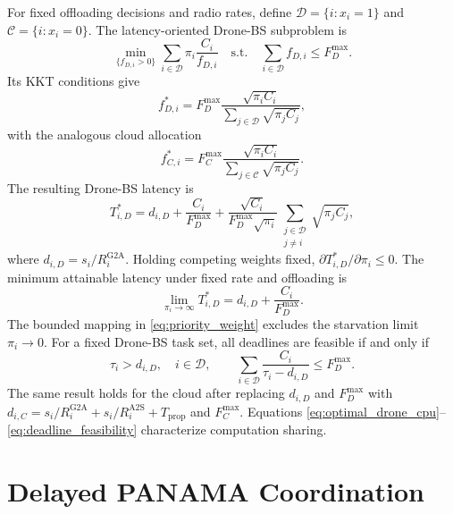 \IfFileExists{IEEEtran.cls}{\documentclass[conference]{IEEEtran}}{\documentclass[10pt,twocolumn]{article}}
\newcommand{\Dset}{\mathcal{D}}
\newcommand{\Cset}{\mathcal{C}}
\begin{document}
For fixed offloading decisions and radio rates, define $\Dset=\{i:x_i=1\}$ and $\Cset=\{i:x_i=0\}$. The latency-oriented Drone-BS subproblem is
\begin{equation}
    \min_{\{f_{D,i}>0\}}
    \sum_{i\in\Dset}\pi_i\frac{C_i}{f_{D,i}}
    \quad\mathrm{s.t.}\quad
    \sum_{i\in\Dset}f_{D,i}\leq F_D^{\max}.
\end{equation}
Its KKT conditions give
\begin{equation}
    f_{D,i}^{*}
    =F_D^{\max}
    \frac{\sqrt{\pi_iC_i}}
    {\sum_{j\in\Dset}\sqrt{\pi_jC_j}},
    \label{eq:optimal_drone_cpu}
\end{equation}
with the analogous cloud allocation
\begin{equation}
    f_{C,i}^{*}
    =F_C^{\max}
    \frac{\sqrt{\pi_iC_i}}
    {\sum_{j\in\Cset}\sqrt{\pi_jC_j}}.
\end{equation}
The resulting Drone-BS latency is
\begin{equation}
    T_{i,D}^{*}
    =d_{i,D}+\frac{C_i}{F_D^{\max}}
    +\frac{\sqrt{C_i}}{F_D^{\max}\sqrt{\pi_i}}
    \sum_{\substack{j\in\Dset\\j\neq i}}\sqrt{\pi_jC_j},
    \label{eq:priority_delay}
\end{equation}
where $d_{i,D}=s_i/R_i^{\mathrm{G2A}}$. Holding competing weights fixed, $\partial T_{i,D}^{*}/\partial\pi_i\leq0$. The minimum attainable latency under fixed rate and offloading is
\begin{equation}
    \lim_{\pi_i\rightarrow\infty}T_{i,D}^{*}
    =d_{i,D}+\frac{C_i}{F_D^{\max}}.
\end{equation}
The bounded mapping in \eqref{eq:priority_weight} excludes the starvation limit $\pi_i\rightarrow0$. For a fixed Drone-BS task set, all deadlines are feasible if and only if
\begin{equation}
    \tau_i>d_{i,D},\quad i\in\Dset,
    \qquad
    \sum_{i\in\Dset}\frac{C_i}{\tau_i-d_{i,D}}\leq F_D^{\max}.
    \label{eq:deadline_feasibility}
\end{equation}
The same result holds for the cloud after replacing $d_{i,D}$ and $F_D^{\max}$ with $d_{i,C}=s_i/R_i^{\mathrm{G2A}}+s_i/R_i^{\mathrm{A2S}}+T_{\mathrm{prop}}$ and $F_C^{\max}$. Equations \eqref{eq:optimal_drone_cpu}--\eqref{eq:deadline_feasibility} characterize computation sharing.


\section{Delayed PANAMA Coordination}
\end{document}
